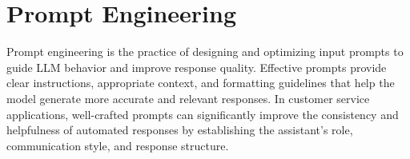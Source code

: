 \section{Prompt Engineering}
\label{sec:prompt-engineering}

Prompt engineering is the practice of designing and optimizing input prompts to guide LLM behavior and improve response quality.
Effective prompts provide clear instructions, appropriate context, and formatting guidelines that help the model generate more accurate and relevant responses.
In customer service applications, well-crafted prompts can significantly improve the consistency and helpfulness of automated responses by establishing the assistant's role, communication style, and response structure.
